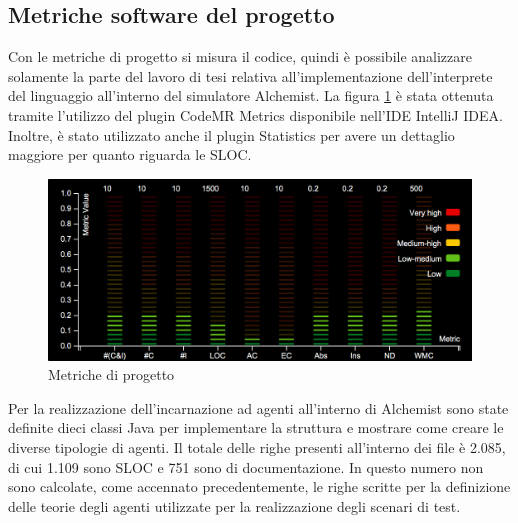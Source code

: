 \subsection{Metriche software del progetto}
Con le metriche di progetto si misura il codice, quindi è possibile analizzare solamente la parte del lavoro di tesi relativa all'implementazione dell'interprete del linguaggio all'interno del simulatore Alchemist.
La figura \ref{fig:codeMetrics} è stata ottenuta tramite l'utilizzo del plugin CodeMR Metrics disponibile nell'IDE IntelliJ IDEA. Inoltre, è stato utilizzato anche il plugin Statistics per avere un dettaglio maggiore per quanto riguarda le SLOC.
\begin{figure}[h] %
\begin{center} %
\includegraphics[width=12cm]{images/codeMetrics.png} %
\caption[Metriche di progetto]{Metriche di progetto} \label{fig:codeMetrics}
\end{center}
\end{figure}

\medskip
Per la realizzazione dell'incarnazione ad agenti all'interno di Alchemist sono state definite dieci classi Java per implementare la struttura e mostrare come creare le diverse tipologie di agenti. Il totale delle righe presenti all'interno dei file è 2.085, di cui 1.109 sono SLOC e 751 sono di documentazione.
In questo numero non sono calcolate, come accennato precedentemente, le righe scritte per la definizione delle teorie degli agenti utilizzate per la realizzazione degli scenari di test.

